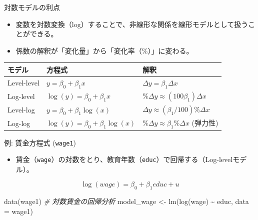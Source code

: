 \documentclass[
  ignorenonframetext,
]{beamer}
\newenvironment{Shaded}{\begin{snugshade}}{\end{snugshade}}
\newcommand{\AttributeTok}[1]{\textcolor[rgb]{0.77,0.63,0.00}{#1}}
\newcommand{\CommentTok}[1]{\textcolor[rgb]{0.56,0.35,0.01}{\textit{#1}}}
\newcommand{\FunctionTok}[1]{\textcolor[rgb]{0.00,0.00,0.00}{#1}}
\newcommand{\NormalTok}[1]{#1}
\newcommand{\OtherTok}[1]{\textcolor[rgb]{0.56,0.35,0.01}{#1}}
\newcommand{\SpecialCharTok}[1]{\textcolor[rgb]{0.00,0.00,0.00}{#1}}
\providecommand{\tightlist}{%
  \setlength{\itemsep}{0pt}\setlength{\parskip}{0pt}}
\begin{document}
\begin{frame}{対数モデルの利点}
\protect\hypertarget{ux5bfeux6570ux30e2ux30c7ux30ebux306eux5229ux70b9}{}
\begin{itemize}
\tightlist
\item
  変数を対数変換（log）することで、非線形な関係を線形モデルとして扱うことができる。
\item
  係数の解釈が「変化量」から「変化率（\%）」に変わる。
\end{itemize}

\begin{longtable}[]{@{}
  >{\raggedright\arraybackslash}p{}
  >{\raggedright\arraybackslash}p{}
  >{\raggedright\arraybackslash}p{}@{}}
\toprule
モデル & 方程式 & 解釈 \\
\midrule
\endhead
Level-level & \(y = \beta_0 + \beta_1 x\) &
\(\Delta y = \beta_1 \Delta x\) \\
Log-level & \(\log(y) = \beta_0 + \beta_1 x\) &
\(\% \Delta y \approx (100 \beta_1) \Delta x\) \\
Level-log & \(y = \beta_0 + \beta_1 \log(x)\) &
\(\Delta y \approx (\beta_1 / 100) \% \Delta x\) \\
Log-log & \(\log(y) = \beta_0 + \beta_1 \log(x)\) &
\(\% \Delta y \approx \beta_1 \% \Delta x\) (弾力性) \\
\bottomrule
\end{longtable}
\end{frame}

\begin{frame}[fragile]{例: 賃金方程式 (\texttt{wage1})}
\protect\hypertarget{ux4f8b-ux8cc3ux91d1ux65b9ux7a0bux5f0f-wage1}{}
\begin{itemize}
\tightlist
\item
  賃金（\texttt{wage}）の対数をとり、教育年数（\texttt{educ}）で回帰する（Log-levelモデル）。
\end{itemize}

\[ \log(wage) = \beta_0 + \beta_1 educ + u \]

\begin{Shaded}
\begin{Highlighting}[]
\FunctionTok{data}\NormalTok{(wage1)}
\CommentTok{\# 対数賃金の回帰分析}
\NormalTok{model\_wage }\OtherTok{\textless{}{-}} \FunctionTok{lm}\NormalTok{(}\FunctionTok{log}\NormalTok{(wage) }\SpecialCharTok{\textasciitilde{}}\NormalTok{ educ, }\AttributeTok{data =}\NormalTok{ wage1)}
\end{Highlighting}
\end{Shaded}
\end{frame}
\end{document}

